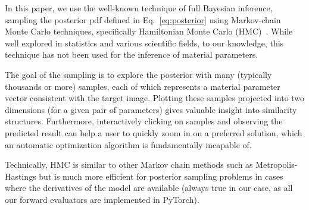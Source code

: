In this paper, we use the well-known technique of full Bayesian inference, sampling the posterior pdf defined in Eq.~\eqref{eq:posterior} using Markov-chain Monte Carlo techniques, specifically Hamiltonian Monte Carlo (HMC)~\cite{Betancourt2017}. While well explored in statistics and various scientific fields, to our knowledge, this technique has not been used for the inference of material parameters.

The goal of the sampling is to explore the posterior with many (typically thousands or more) samples, each of which represents a material parameter vector consistent with the target image. Plotting these samples projected into two dimensions (for a given pair of parameters) gives valuable insight into similarity structures. Furthermore, interactively clicking on samples and observing the predicted result can help a user to quickly zoom in on a preferred solution, which an automatic optimization algorithm is fundamentally incapable of.

Technically, HMC is similar to other Markov chain methods such as Metropolis-Hastings but is much more efficient for posterior sampling problems in cases where the derivatives of the model are available (always true in our case, as all our forward evaluators are implemented in PyTorch).
